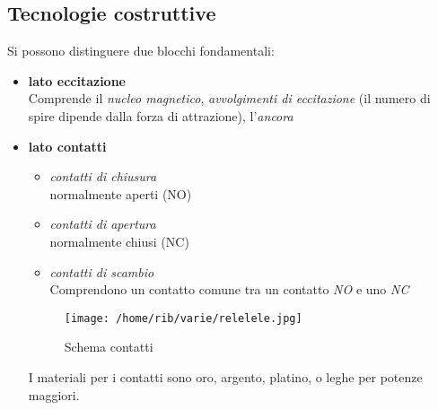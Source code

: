 \documentclass{article}
\begin{document}
\subsection{Tecnologie costruttive}
Si possono  distinguere due blocchi fondamentali:
\begin{itemize}
    \item \textbf{lato eccitazione}\\
    Comprende il \emph{nucleo magnetico}, \emph{avvolgimenti di eccitazione} (il numero di spire dipende dalla forza di attrazione), l'\emph{ancora} 
    \item \textbf{lato contatti}\\
    \begin{itemize}
        \item \textit{contatti di chiusura}\\
        normalmente aperti (NO)
        \item \textit{contatti di apertura}\\
        normalmente chiusi (NC)
        \item \textit{contatti di scambio}\\
        Comprendono un contatto comune tra un contatto \emph{NO} e uno \emph{NC}
    \end{itemize}

    \begin{figure}[H]
        \texttt{[image: /home/rib/varie/relelele.jpg]}
        \caption{Schema contatti}
        \label{contatt}
     \end{figure}
I materiali per i contatti sono oro, argento, platino, o leghe per potenze maggiori.
\end{itemize}
\end{document}
